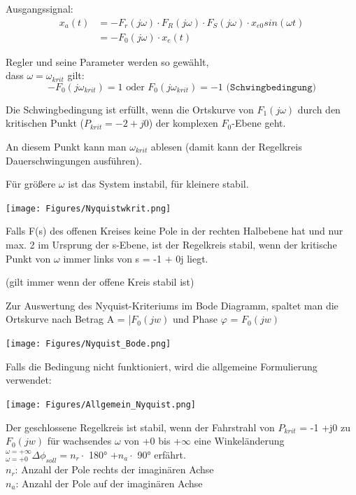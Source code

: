 Ausgangssignal:
\begin{align*}
	x_a(t) & =-F_r (j\omega) \cdot F_R (j\omega) \cdot F_S (j\omega) \cdot
	x_{e0}sin(\omega t)                                                    \\
	       & = -F_0 (j\omega) \cdot x_e (t)
\end{align*}

Regler und seine Parameter werden so gewählt,\\ dass $\omega = \omega_{krit}$ gilt:
\[
	-F_0 (j\omega_{krit})=1 \text{ oder } F_0 (j\omega_{krit})=-1 \texttt{ (Schwingbedingung)}
\]

\begin{mdframed}[style=exercise]
	Die Schwingbedingung ist erfüllt, wenn die Ortskurve von $F_1 (j\omega)$
	durch den kritischen Punkt ($P_{krit} = -2+j0$) der komplexen $F_0$-Ebene
	geht.

	An diesem Punkt kann man $\omega_{krit}$ ablesen (damit kann der Regelkreis
	Dauerschwingungen ausführen).

	Für größere $\omega$ ist das System instabil, für kleinere stabil.
\end{mdframed}

\texttt{[image: Figures/Nyquistwkrit.png]}

\begin{mdframed}[style=exercise]
	Falls F(s) des offenen Kreises keine Pole in der rechten Halbebene hat und
	nur max. 2 im Ursprung der s-Ebene, ist der Regelkreis stabil, wenn der
	kritische Punkt von $\omega$ immer links von s = -1 + 0j liegt.

	\footnotesize
	(gilt immer wenn der offene Kreis stabil ist)
\end{mdframed}

Zur Auswertung des Nyquist-Kriteriums im Bode Diagramm, spaltet man die Ortskurve nach Betrag
A = |$F_0 (jw)$ und Phase $\varphi$ = $F_0(jw)$

\texttt{[image: Figures/Nyquist\_Bode.png]}

Falls die Bedingung nicht funktioniert, wird die allgemeine Formulierung verwendet:

\texttt{[image: Figures/Allgemein\_Nyquist.png]}

\begin{mdframed}[style=exercise]
	Der geschlossene Regelkreis ist stabil, wenn der Fahrstrahl von $P_{krit}$ = -1 +j0
	zu $F_0 (jw)$ für wachsendes $\omega$ von +0 bis +$\infty$ eine Winkeländerung
	$^{\omega=+\infty}_{\omega=+0} \Delta \phi _{soll} = n_r \cdot$ 180° $+n_a \cdot$ 90°
	erfährt.\\
	$n_r$: Anzahl der Pole rechts der imaginären Achse\\
	$n_a$: Anzahl der Pole auf der imaginären Achse
\end{mdframed}

